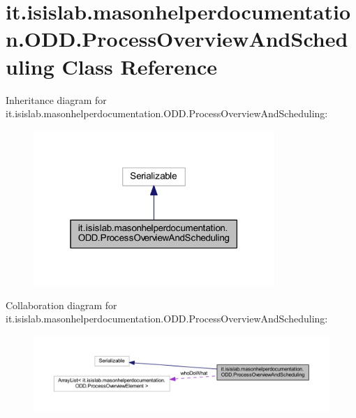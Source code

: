 \hypertarget{classit_1_1isislab_1_1masonhelperdocumentation_1_1_o_d_d_1_1_process_overview_and_scheduling}{\section{it.\-isislab.\-masonhelperdocumentation.\-O\-D\-D.\-Process\-Overview\-And\-Scheduling Class Reference}
\label{classit_1_1isislab_1_1masonhelperdocumentation_1_1_o_d_d_1_1_process_overview_and_scheduling}
}


Inheritance diagram for it.\-isislab.\-masonhelperdocumentation.\-O\-D\-D.\-Process\-Overview\-And\-Scheduling\-:
\nopagebreak
\begin{figure}[H]
\begin{center}
\leavevmode
\includegraphics[width=259pt]{classit_1_1isislab_1_1masonhelperdocumentation_1_1_o_d_d_1_1_process_overview_and_scheduling__inherit__graph}
\end{center}
\end{figure}


Collaboration diagram for it.\-isislab.\-masonhelperdocumentation.\-O\-D\-D.\-Process\-Overview\-And\-Scheduling\-:
\nopagebreak
\begin{figure}[H]
\begin{center}
\leavevmode
\includegraphics[width=350pt]{classit_1_1isislab_1_1masonhelperdocumentation_1_1_o_d_d_1_1_process_overview_and_scheduling__coll__graph}
\end{center}
\end{figure}
